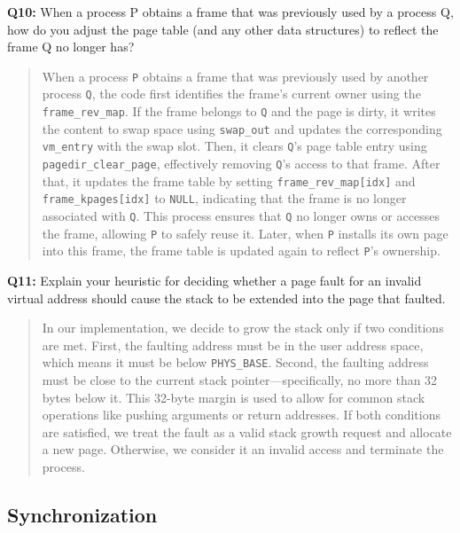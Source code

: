 \documentclass[a4paper,11pt]{paper}
\begin{document}
\textbf{Q10:} When a process P obtains a frame that was previously used by a process Q, how do you adjust the page table (and any other data structures) to reflect the frame Q no longer has?
\begin{quote}
When a process \texttt{P} obtains a frame that was previously used by another process \texttt{Q}, the code first identifies the frame’s current owner using the \texttt{frame\_rev\_map}. If the frame belongs to \texttt{Q} and the page is dirty, it writes the content to swap space using \texttt{swap\_out} and updates the corresponding \texttt{vm\_entry} with the swap slot. Then, it clears \texttt{Q}'s page table entry using \texttt{pagedir\_clear\_page}, effectively removing \texttt{Q}'s access to that frame. After that, it updates the frame table by setting \texttt{frame\_rev\_map[idx]} and \texttt{frame\_kpages[idx]} to \texttt{NULL}, indicating that the frame is no longer associated with \texttt{Q}. This process ensures that \texttt{Q} no longer owns or accesses the frame, allowing \texttt{P} to safely reuse it. Later, when \texttt{P} installs its own page into this frame, the frame table is updated again to reflect \texttt{P}’s ownership.
\end{quote}


\textbf{Q11:} Explain your heuristic for deciding whether a page fault for an invalid virtual address should cause the stack to be extended into the page that faulted.
\begin{quote}
In our implementation, we decide to grow the stack only if two conditions are met. First, the faulting address must be in the user address space, which means it must be below \texttt{PHYS\_BASE}. Second, the faulting address must be close to the current stack pointer—specifically, no more than 32 bytes below it. This 32-byte margin is used to allow for common stack operations like pushing arguments or return addresses. If both conditions are satisfied, we treat the fault as a valid stack growth request and allocate a new page. Otherwise, we consider it an invalid access and terminate the process.
\end{quote}


\subsection{Synchronization}
\end{document}
